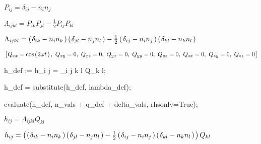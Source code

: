\documentclass[10pt]{article}
\newcommand\brwrap[3]{%
  \setbox0=\hbox{$#2$}
  \left#1\vbox to \the\ht0{\hbox to 0pt{}}\right.\kern-.2em
  \begingroup #2\endgroup\kern-.15em
  \left.\vbox to \the\ht0{\hbox to 0pt{}}\right#3
}
\begin{document}
\begin{adjustwidth}{1em}{0cm}${}P_{i j} = \delta_{i j}-n_{i} n_{j}$\end{adjustwidth}
\begin{adjustwidth}{1em}{0cm}${}\Lambda_{i j k l} = P_{i k} P_{j l} - \frac{1}{2}P_{i j} P_{k l}$\end{adjustwidth}
\begin{adjustwidth}{1em}{0cm}${}\Lambda_{i j k l} = \brwrap{(}{\delta_{i k}-n_{i} n_{k}}{)} \brwrap{(}{\delta_{j l}-n_{j} n_{l}}{)} - \frac{1}{2}\brwrap{(}{\delta_{i j}-n_{i} n_{j}}{)} \brwrap{(}{\delta_{k l}-n_{k} n_{l}}{)}$\end{adjustwidth}
\begin{adjustwidth}{1em}{0cm}${}\brwrap{[}{Q_{x x} = \cos\brwrap{(}{2\omega t}{)},~ Q_{x y} = 0,~ Q_{x z} = 0,~ Q_{y x} = 0,~ Q_{y y} = 0,~ Q_{y z} = 0,~ Q_{z x} = 0,~ Q_{z y} = 0,~ Q_{z z} = 0}{]}$\end{adjustwidth}
\begin{python}
\end{python}
\begin{python}
\end{python}
\begin{python}
h_def := h_{i j} = \Lambda_{i j k l} Q_{k l};

h_def = substitute(h_def, lambda_def);

evaluate(h_def, n_vals + q_def + delta_vals, rhsonly=True);
\end{python}
\begin{adjustwidth}{1em}{0cm}${}h_{i j} = \Lambda_{i j k l} Q_{k l}$\end{adjustwidth}
\begin{adjustwidth}{1em}{0cm}${}h_{i j} = \brwrap{(}{\brwrap{(}{\delta_{i k}-n_{i} n_{k}}{)} \brwrap{(}{\delta_{j l}-n_{j} n_{l}}{)} - \frac{1}{2}\brwrap{(}{\delta_{i j}-n_{i} n_{j}}{)} \brwrap{(}{\delta_{k l}-n_{k} n_{l}}{)}}{)} Q_{k l}$\end{adjustwidth}
\end{document}
